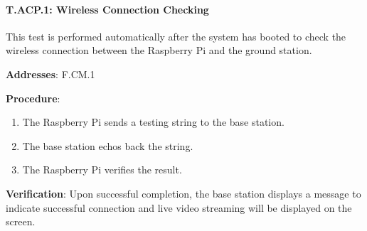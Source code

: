 \paragraph{T.ACP.1: Wireless Connection Checking}

This test is performed automatically after the system has booted to check the wireless connection between the Raspberry Pi and the ground station.

\textbf{Addresses}: F.CM.1

\textbf{Procedure}:
\begin{enumerate}[noitemsep]
    \item The Raspberry Pi sends a testing string to the base station.
    \item The base station echos back the string.
    \item The Raspberry Pi verifies the result.
\end{enumerate}

\textbf{Verification}: 
Upon successful completion, the base station displays a message to indicate successful connection and live video streaming will be displayed on the screen.